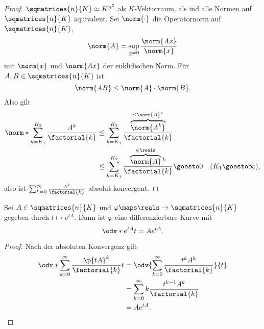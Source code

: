 \begin{proof}
  \( \sqmatrices{n}{K}\simeq K^{n^2} \) als \( K \)-Vektorraum, als ind alle Normen auf \( \sqmatrices{n}{K} \) äquivalent. Sei \( \norm{\cdot} \) die Operatornorm auf \( \sqmatrices{n}{K} \), \dh
  \begin{equation*}
    \norm{A}=\sup_{\underline{x}\neq 0}\frac{\norm{Ax}}{\norm{x}}
  \end{equation*}
  mit \( \norm{x} \) und \( \norm{Ax}  \) der euklidischen Norm. Für \( A,B\in \sqmatrices{n}{K} \) ist
  \begin{equation*}
    \norm{AB}\leq \norm{A}\cdot \norm{B}.
  \end{equation*}
  Also gilt
  \begin{align*}
    \norm*{\sum_{k=K_1}^{K_2}\frac{A^k}{\factorial{k}}}&\leq \sum_{k=K_1}^{K_2}\frac{\overbrace{\norm{A^k}}^{\leq \norm{A}^k}}{\factorial{k}}\\
    &\leq \sum_{k=K_1}^{K_2}\frac{\overbrace{\norm{A}}^{\in \reals}{}^k}{\factorial{k}}\goesto 0 \quad (K_1\goesto \infty),
  \end{align*}
  also ist \( \sum_{k=0}^{\infty}\frac{A^k}{\factorial{k}} \) absolut konvergent.
\end{proof}
\begin{korollar}
  Sei \( A\in \sqmatrices{n}{K} \) und \( \varphi\maps \reals\to \sqmatrices{n}{K} \) gegeben durch \( t\mapsto e^{tA} \). Dann ist \( \varphi \) eine differenzierbare Kurve mit
  \begin{equation*}
    \odv*{e^{tA}}{t}=Ae^{tA}.
  \end{equation*}
\end{korollar}
\begin{proof}
  Nach der absoluten Konvergenz gilt
  \begin{align*}
    \odv*{\sum_{k=0}^{\infty}\frac{\p{tA}^k}{\factorial{k}}}{t}&=\odv{\sum_{k=0}^{\infty}\frac{t^k A^k}{\factorial{k}}}{t}\\
    &=\sum_{k=0}^{\infty} k\frac{t^{k-1}A^k}{\factorial{k}}\\
    &=Ae^{tA}.
  \end{align*}
\end{proof}
